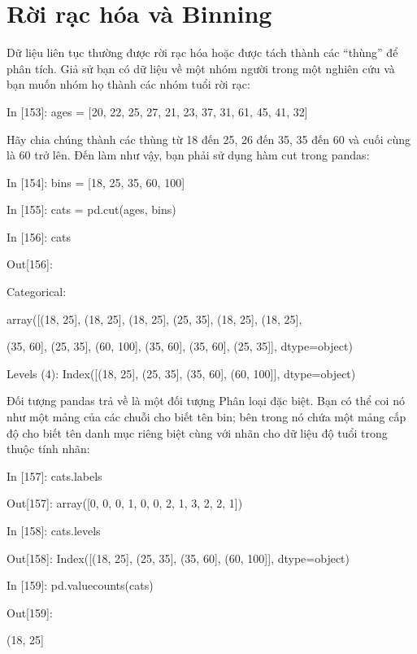 \section{Rời rạc hóa và Binning}
Dữ liệu liên tục thường được rời rạc hóa hoặc được tách thành các “thùng” để phân tích. 
Giả sử bạn có dữ liệu về một nhóm người trong một nghiên cứu và bạn muốn nhóm họ 
thành các nhóm tuổi rời rạc:\par
    \quad\textup{In [153]: ages = [20, 22, 25, 27, 21, 23, 37, 31, 61, 45, 41, 32]}\par
Hãy chia chúng thành các thùng từ 18 đến 25, 26 đến 35, 35 đến 60 và cuối cùng là 60 trở lên. Đến 
làm như vậy, bạn phải sử dụng hàm cut trong pandas:\par
    \quad\textup{In [154]: bins = [18, 25, 35, 60, 100] }\par
    \quad\textup{In [155]: cats = pd.cut(ages, bins) }\par
    \quad\textup{In [156]: cats   }\par 
    \quad\textup{Out[156]: }\par
    \quad\textup{Categorical:   }\par
    \quad\textup{array([(18, 25], (18, 25], (18, 25], (25, 35], (18, 25], (18, 25],  }\par
    \quad\textup{\quad\quad (35, 60], (25, 35], (60, 100], (35, 60], (35, 60], (25, 35]], dtype=object)  }\par
    \quad\textup{ Levels (4): Index([(18, 25], (25, 35], (35, 60], (60, 100]], dtype=object)}\par
Đối tượng pandas trả về là một đối tượng Phân loại đặc biệt. Bạn có thể coi nó như một mảng 
của các chuỗi cho biết tên bin; bên trong nó chứa một mảng cấp độ cho biết 
tên danh mục riêng biệt cùng với nhãn cho dữ liệu độ tuổi trong thuộc tính nhãn:\par
    \quad\textup{In [157]: cats.labels  }\par
    \quad\textup{Out[157]: array([0, 0, 0, 1, 0, 0, 2, 1, 3, 2, 2, 1])  }\par
    \quad\textup{In [158]: cats.levels  }\par
    \quad\textup{Out[158]: Index([(18, 25], (25, 35], (35, 60], (60, 100]], dtype=object)  }\par
    \quad\textup{In [159]: pd.value\textunderscore counts(cats)  }\par
    \quad\textup{Out[159]:  }\par
    \quad\textup{(18, 25]   }\par
